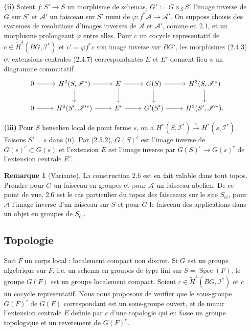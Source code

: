 \documentclass[11pt,a4paper]{article}
\theoremstyle{plain}
\theoremstyle{definition}
\newtheorem{remark}[theorem]{Remarque}
\DeclareMathOperator{\Spec}{Spec}
\newcommand{\et}{\text{\'et}}
\begin{document}
\textbf{(ii)} Soient $f : S' \to S$ un morphisme de schemas, $G' := G \times_S S'$ l'image inverse de $G$ sur $S'$ et $\mathscr{A}'$ un faisceau sur $S'$ muni de $\varphi : f^* \mathscr{A} \to \mathscr{A}'$. On suppose choisis des systemes de resolutions d'images inverses de $\mathscr{A}$ et $\mathscr{A}'$, comme en 2.1, et un morphisme prolongeant $\varphi$ entre elles. Pour $c$ un cocycle representatif de $c \in \widetilde{H}^4(BG, \mathscr{I}^*)$ et $c' = \varphi f^* c$ son image inverse sur $BG'$, les morphismes (2.4.3) et extensions centrales (2.4.7) correspondantes $E$ et $E'$ donnent lieu a un diagramme commutatif
\[
\begin{tikzcd}
0 \arrow{r} & H^2(S, \mathscr{I}^*) \arrow{r} \arrow{d} & E \arrow{r} \arrow{d} & G(S) \arrow{r} \arrow{d} & H^3(S, \mathscr{I}^*) \arrow{d} \\
0 \arrow{r} & H^2(S', \mathscr{I}'^*) \arrow{r} & E' \arrow{r} & G'(S') \arrow{r} & H^3(S', \mathscr{I}'^*).
\end{tikzcd}
\]

\textbf{(iii)} Pour $S$ henselien local de point ferme $s$, on a $H^*(S, \mathscr{I}^*) \xrightarrow{\sim} H^*(s, \mathscr{I}^*)$. Faisons $S' = s$ dans (ii). Par (2.5.2), $G(S)^c$ est l'image inverse de $G(s)^c \subset G(s)$ et l'extension $E$ est l'image inverse par $G(S)^c \to G(s)^c$ de l'extension centrale $E'$.

\begin{remark}[Variante]\label{2.8}
La construction 2.6 est en fait valable dans tout topos. Prendre pour $G$ un faisceau en groupes et pour $\mathscr{A}$ un faisceau abelien. De ce point de vue, 2.6 est le cas particulier du topos des faisceaux sur le site $S_{\et}$, pour $\mathscr{A}$ l'image inverse d'un faisceau sur $S$ et pour $G$ le faisceau des applications dans un objet en groupes de $S_{\et}$.
\end{remark}

\subsection{Topologie}\label{2.9}

Soit $F$ un corps local : localement compact non discret. Si $G$ est un groupe algebrique sur $F$, i.e. un schema en groupes de type fini sur $S = \Spec(F)$, le groupe $G(F)$ est un groupe localement compact. Soient $c \in \widetilde{H}^4(BG, \mathscr{I}^*)$ et $c$ un cocycle representatif. Nous nous proposons de verifier que le sous-groupe $G(F)^c$ de $G(F)$ correspondant est un sous-groupe ouvert, et de munir l'extension centrale $E$ definie par $c$ d'une topologie qui en fasse un groupe topologique et un revetement de $G(F)^c$.
\end{document}
